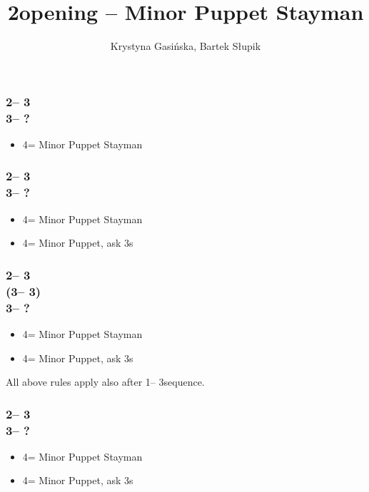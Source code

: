 \documentclass[12pt, a4paper]{article}
\title{2\nt opening -- Minor Puppet Stayman}
\author{Krystyna Gasińska, Bartek Słupik}
\begin{document}
\maketitle


\subsubsection*{2\nt -- 3\clubs\\
                3\diams -- ?}
\begin{itemize}
    \item 4\clubs = Minor Puppet Stayman
\end{itemize}

\subsubsection*{2\nt -- 3\clubs\\
                3\major -- ?}
\begin{itemize}
    \item 4\clubs = Minor Puppet Stayman
    \item 4\diams = Minor Puppet, ask 3s
\end{itemize}

\subsubsection*{2\nt -- 3\clubs\\
                (3\diams -- 3\major)\\
                3\nt -- ?}
\begin{itemize}
    \item 4\clubs = Minor Puppet Stayman
    \item 4\diams = Minor Puppet, ask 3s
\end{itemize}

All above rules apply also after 1\nt -- 3\clubs sequence.

\subsubsection*{2\nt -- 3\diams\\
                3\hearts -- ?}
\begin{itemize}
    \item 4\clubs = Minor Puppet Stayman
    \item 4\diams = Minor Puppet, ask 3s
\end{itemize}
\end{document}
